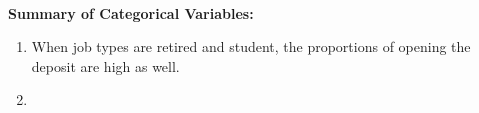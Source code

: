 \documentclass[11pt,a4paper]{article}
\begin{document}
\begin{figure}
        \qquad
    \end{figure}
    \quad \\
    \textbf{Summary of Categorical Variables:}
    \begin{enumerate}
        \item When job types are retired and student, the proportions of opening the deposit are high as well.
        \item 
    \end{enumerate}
    
\end{document}
